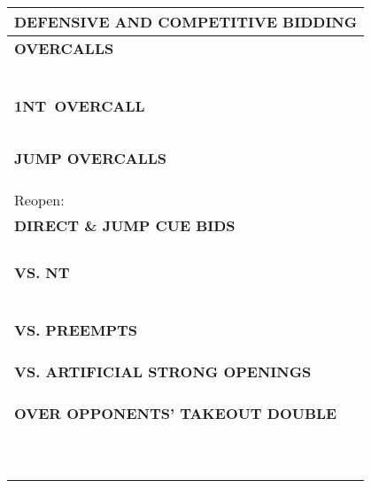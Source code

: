 \documentclass{article}
\newcommand{\nt}{\relsize{-1}NT\relsize{1}}
\begin{document}
\noindent
\small{
\begin{minipage}{90mm}
	\begin{tabular}{| p{88mm} |}
		\hline
		\cellcolor[gray]{0.9} \textbf{DEFENSIVE AND COMPETITIVE BIDDING} \\ \hline
		\textbf{OVERCALLS} \\ \hline
		\\ \hline
		\\ \hline
		\\ \hline
		\\ \hline
		\\ \hline
		\\ \hline
		\textbf{1\nt \ OVERCALL} \\ \hline
		\\ \hline
		\\ \hline
		\\ \hline
		\\ \hline
		\\ \hline
		\textbf{JUMP OVERCALLS} \\ \hline
		\\ \hline
		\\ \hline
		\\ \hline
		Reopen: \\ \hline
		\textbf{DIRECT \& JUMP CUE BIDS} \\ \hline
		\\ \hline
		\\ \hline
		\\ \hline
		\\ \hline
		\textbf{VS. NT} \\ \hline
		\\ \hline
		\\ \hline
		\\ \hline
		\\ \hline
		\\ \hline
		\\ \hline
		\textbf{VS. PREEMPTS} \\ \hline
		\\ \hline
		\\ \hline
		\\ \hline
		\textbf{VS. ARTIFICIAL STRONG OPENINGS} \\ \hline
		\\ \hline
		\\ \hline
		\\ \hline
		\textbf{OVER OPPONENTS' TAKEOUT DOUBLE} \\ \hline
		\\ \hline
		\\ \hline
		\\ \hline
		\\ \hline
		\\ \hline
		\\ \hline
		\\ \hline
		\\ \hline
		\\ \hline
		\\ \hline
	\end{tabular}
\end{minipage}
}
\end{document}
